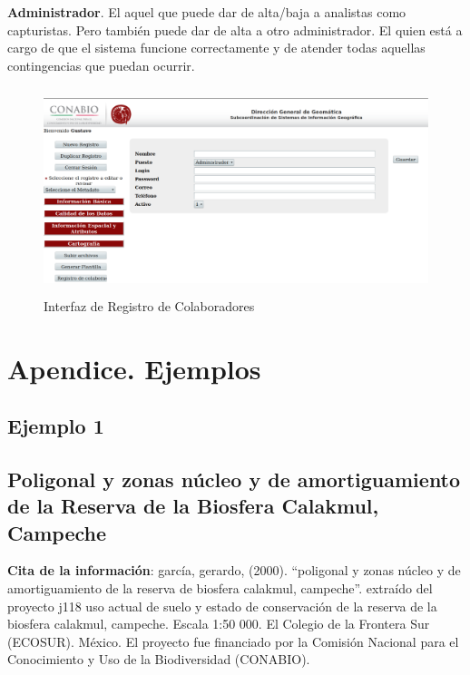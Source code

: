\documentclass[twoside]{book}
\begin{document}
\textbf{Administrador}. El aquel que puede dar de alta/baja a analistas como capturistas. Pero también puede dar de alta a otro administrador. El quien está a cargo de que el sistema funcione correctamente y de atender todas aquellas contingencias que puedan ocurrir.

\begin{figure}[h!] %
	\includegraphics[width=12cm, height=6cm]{img/registroColaboradores} %
	\caption{Interfaz de Registro de Colaboradores}
\end{figure}


\chapter*{Apendice. Ejemplos}
\section*{Ejemplo 1}
\section*{Poligonal y zonas núcleo y de amortiguamiento de la Reserva de la Biosfera Calakmul, Campeche}


\textbf{Cita de la información}: garcía, gerardo, (2000). “poligonal y zonas núcleo y de amortiguamiento de la reserva de biosfera calakmul, campeche”. extraído del proyecto j118 uso actual de suelo y estado de conservación de la reserva de la biosfera calakmul, campeche.
Escala 1:50 000. El Colegio de la Frontera Sur (ECOSUR). México. El proyecto fue
financiado por la Comisión Nacional para el Conocimiento y Uso de la Biodiversidad
(CONABIO).
\end{document}
